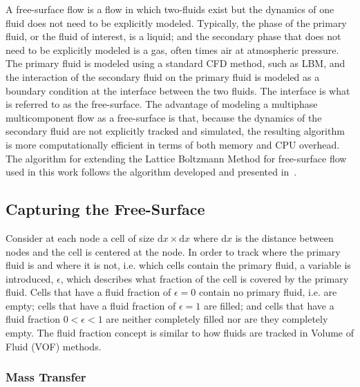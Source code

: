 \documentclass[pdftex,ms]{pittetd}
\begin{document}
A free-surface flow is a flow in which two-fluids exist but the dynamics of one fluid does not need to be explicitly modeled.
Typically, the phase of the primary fluid, or the fluid of interest, is a liquid; and the secondary phase that does not need to be explicitly modeled is a gas, often times air at atmospheric pressure.
The primary fluid is modeled using a standard CFD method, such as LBM, and the interaction of the secondary fluid on the primary fluid is modeled as a boundary condition at the interface between the two fluids.
The interface is what is referred to as the free-surface.
The advantage of modeling a multiphase multicomponent flow as a free-surface is that, because the dynamics of the secondary fluid are not explicitly tracked and simulated, the resulting algorithm is more computationally efficient in terms of both memory and CPU overhead.
The algorithm for extending the Lattice Boltzmann Method for free-surface flow used in this work follows the algorithm developed and presented in~\citet{korner2005lattice,thurey2005interactive}.

\subsection{Capturing the Free-Surface}

Consider at each node a cell of size $\text{d}x \times \text{d}x$ where $\text{d}x$ is the distance between nodes and the cell is centered at the node.
In order to track where the primary fluid is and where it is not, i.e. which cells contain the primary fluid, a variable is introduced, $\epsilon$, which describes what fraction of the cell is covered by the primary fluid.
Cells that have a fluid fraction of $\epsilon = 0$ contain no primary fluid, i.e. are empty; cells that have a fluid fraction of $\epsilon = 1$ are filled; and cells that have a fluid fraction $0 < \epsilon < 1$ are neither completely filled nor are they completely empty.
The fluid fraction concept is similar to how fluids are tracked in Volume of Fluid (VOF) methods.

\subsubsection{Mass Transfer}
\end{document}

